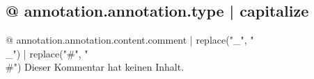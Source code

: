 \subsection{{@ annotation.annotation.type | capitalize }}

{@ annotation.annotation.content.comment | replace("_", "\\_") | replace("#", "\\#") }
Dieser Kommentar hat keinen Inhalt.
